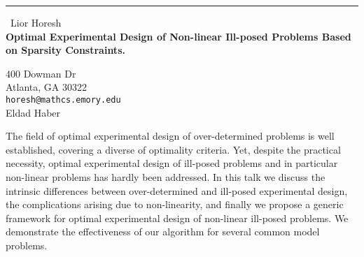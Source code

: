 \documentclass{report}
\begin{document}
\begin{center}
\rule{6in}{1pt} \
{\large Lior Horesh \\
{\bf Optimal Experimental Design of Non-linear Ill-posed Problems Based on
Sparsity Constraints.}
}

400 Dowman Dr \\ Atlanta, GA 30322 \\
{\tt horesh@mathcs.emory.edu}\\
Eldad Haber\end{center}


The field of optimal experimental design of over-determined
problems is well established, covering a diverse of optimality criteria.
Yet, despite the practical necessity, optimal experimental design of
ill-posed problems and in particular non-linear problems has hardly been
addressed. In this talk we discuss the intrinsic differences between
over-determined and ill-posed experimental design, the complications arising
due to non-linearity, and finally we propose a generic framework for optimal
experimental design of non-linear ill-posed problems. We demonstrate the
effectiveness of our algorithm for several common model problems.
\end{document}
